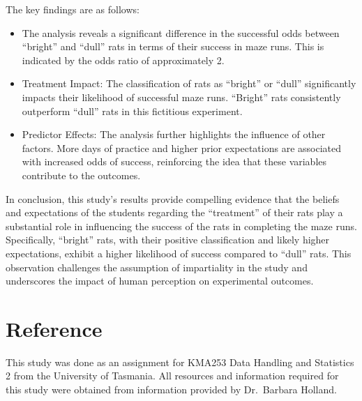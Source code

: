\documentclass[
]{article}
\begin{document}
The key findings are as follows:

\begin{itemize}
\item
  The analysis reveals a significant difference in the successful odds
  between ``bright'' and ``dull'' rats in terms of their success in maze
  runs. This is indicated by the odds ratio of approximately 2.
\item
  Treatment Impact: The classification of rats as ``bright'' or ``dull''
  significantly impacts their likelihood of successful maze runs.
  ``Bright'' rats consistently outperform ``dull'' rats in this
  fictitious experiment.
\item
  Predictor Effects: The analysis further highlights the influence of
  other factors. More days of practice and higher prior expectations are
  associated with increased odds of success, reinforcing the idea that
  these variables contribute to the outcomes.
\end{itemize}

In conclusion, this study's results provide compelling evidence that the
beliefs and expectations of the students regarding the ``treatment'' of
their rats play a substantial role in influencing the success of the
rats in completing the maze runs. Specifically, ``bright'' rats, with
their positive classification and likely higher expectations, exhibit a
higher likelihood of success compared to ``dull'' rats. This observation
challenges the assumption of impartiality in the study and underscores
the impact of human perception on experimental outcomes.

\hypertarget{reference}{%
\section{Reference}\label{reference}}

This study was done as an assignment for KMA253 Data Handling and
Statistics 2 from the University of Tasmania. All resources and
information required for this study were obtained from information
provided by Dr.~Barbara Holland.
\end{document}
